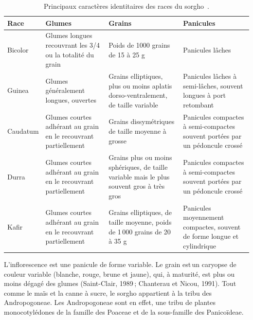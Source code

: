 \documentclass[a4paper,11pt]{article}
\begin{document}
\begin{table}
\begin{center}
  \begin{tabular}{|lb{4cm}|b{3.5cm}|b{3.5cm}|}
   \hline
  Race & Glumes  & Grains  & Panicules  \\ \hline
  Bicolor & Glumes longues recouvrant les 3/4 ou la totalité du grain  & Poids de 1000 grains de 15 à 25 g & Panicules lâches \\ \hline
  Guinea & Glumes généralement longues, ouvertes & Grains elliptiques, plus ou moins aplatis dorso-ventralement, de taille variable & Panicules lâches à semi-lâches, souvent longues à port retombant \\ \hline
  Caudatum & Glumes courtes adhérant au grain en le recouvrant partiellement & Grains dissymétriques de taille moyenne à grosse & Panicules compactes à semi-compactes souvent portées par un pédoncule crossé \\ \hline
  Durra & Glumes courtes adhérant au grain en le recouvrant partiellement & Grains plus ou moins sphériques, de taille variable mais le plus souvent gros à très gros & Panicules compactes à semi-compactes souvent portées par un pédoncule crossé \\ \hline
  Kafir & Glumes courtes adhérant au grain en le recouvrant partiellement & Grains elliptiques, de taille moyenne, poids de 1\,000 grains de 20 à 35 g & Panicules moyennement compactes, souvent de forme longue et cylindrique \\ \hline
\end{tabular}
\caption{Principaux caractères identitaires des races du sorgho \protect\,\cite{Chantereau_2013}.}
\label{tableau:Chantereau_2013}
\end{center}
\end{table}


 
\newpage



L’inflorescence est une panicule de forme variable. Le grain est\,un
caryopse de couleur variable (blanche, rouge, brune et jaune), qui, à
maturité, est plus ou moins dégagé des glumes (Saint-Clair, 1989\,;
Chanterau et Nicou, 1991). Tout comme le maïs et la canne à sucre, le
sorgho appartient à la tribu des Andropogoneae. Les Andropogoneae sont
en effet, une tribu de plantes monocotylédones de la famille des
Poaceae et de la sous-famille des Panicoïdeae.
\end{document}

